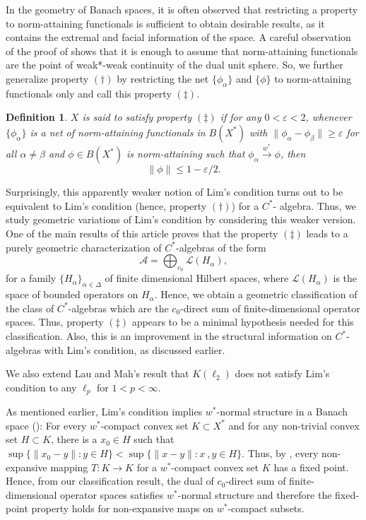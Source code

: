\documentclass[11pt]{amsart}
\newcommand{\e}{\varepsilon}
\newtheorem{Def}[thm]{Definition}
\begin{document}
In the geometry of Banach spaces, it is often observed that restricting a property to norm-attaining functionals is sufficient to obtain desirable results, as it contains the extremal and facial information of the space. A careful observation of the proof of \cite[Theorem 2]{CPW} shows that it is enough to assume that norm-attaining functionals are the point of weak*-weak continuity of the dual unit sphere. So, we further generalize property $(\dagger)$ by restricting the net $\{\phi_\alpha\}$ and $\{\phi\}$ to norm-attaining functionals only and call this property $(\ddagger)$.
\begin{Def}
$X$ is said to satisfy property $(\ddag)$ if for any $0 <\e <2$, whenever $\{\phi_{\alpha}\}$ is a net of norm-attaining functionals in $B(X^*)$ with $\|\phi_{\alpha}-\phi_{\beta}\| \geq \e$ for all $\alpha \neq \beta$ and $\phi \in B(X^*)$ is norm-attaining such that $\phi_{\alpha} \xrightarrow{w^\ast} \phi$, then
\[
\|\phi\| \leq 1 - \e/2.
\]
\end{Def}

Surprisingly, this apparently weaker notion of Lim's condition turns out to be equivalent to Lim's condition (hence, property $(\dagger)$) for a $C^*$- algebra. Thus, we study geometric variations of Lim's condition by considering this weaker version. One of the main results of this article proves that the property $(\ddagger)$ leads to a purely geometric characterization of $C^*$-algebras of the form
\[
\mathcal{A}=\bigoplus_{c_0}\mathcal{L}(H_\alpha),
\]
for a family $\{H_\alpha\}_{\alpha \in \Delta}$ of finite dimensional Hilbert spaces, where $\mathcal{L}(H_\alpha)$ is the space of bounded operators on $H_\alpha$. Hence, we obtain a geometric classification of the class of $C^*$-algebras which are the $c_0$-direct sum of finite-dimensional operator spaces. Thus, property $(\ddagger)$ appears to be a minimal hypothesis needed for this classification. Also, this is an improvement in the structural information on $C^*$-algebras with Lim's condition, as discussed earlier.

We also extend Lau and Mah's result that $K(\ell_2)$ does not satisfy Lim's condition to any $\ell_p$ for $1 <p <\infty$. 

As mentioned earlier, Lim's condition implies $w^*$-normal structure in a Banach space (\cite[Theorem 2]{Lim}): For every $w^*$-compact convex set $K \subset X^\ast$ and for any non-trivial convex set $H \subset K$, there is a $x_0 \in H$ such that $\sup\{\|x_0-y\|:y\in H\}< \sup\{\|x-y\|:x~,y \in H\}$. Thus, by \cite[Theorem 1]{Lim}, every non-expansive mapping  $T: K \rightarrow K$ for a $w^*$-compact convex set $K$ has a fixed point. Hence, from our classification result, the dual of $c_0$-direct sum of finite-dimensional operator spaces satisfies $w^*$-normal structure and therefore the fixed-point property holds for non-expansive maps on $w^*$-compact subsets. 
\end{document}
